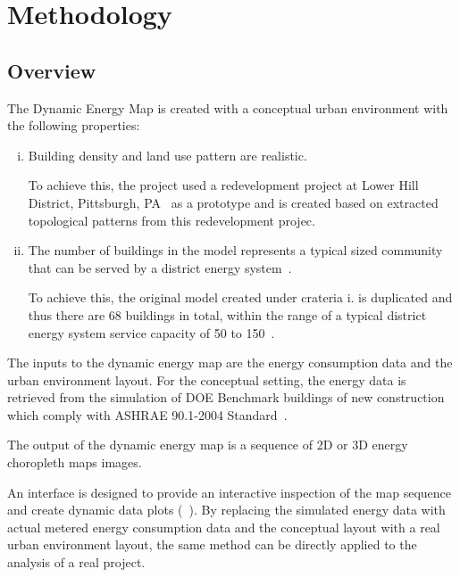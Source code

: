 
\chapter{Methodology} %

\label{Chapter4} %


\section{Overview}
The Dynamic Energy Map is created with a conceptual urban environment
with the following properties:
\begin{enumerate}[i.]
\item Building density and land use pattern are realistic.  
  
  To achieve this, the project used a redevelopment project at Lower
  Hill District, Pittsburgh, PA~\cite{Ramesh2013} as a prototype and
  is created based on extracted topological patterns from this
  redevelopment projec.

\item The number of buildings in the model represents a typical sized
  community that can be served by a district energy
  system~\cite{IDEA2012}.
  
  To achieve this, the original model created under crateria i. is
  duplicated and thus there are 68 buildings in total, within the
  range of a typical district energy system service capacity of 50 to
  150~\cite{IDEA2012}.

\end{enumerate}

The inputs to the dynamic energy map are the energy consumption data
and the urban environment layout. For the conceptual setting, the
energy data is retrieved from the simulation of DOE Benchmark
buildings of new construction which comply with ASHRAE 90.1-2004
Standard~\cite{DOE2015}.

The output of the dynamic energy map is a sequence of 2D or 3D energy
choropleth maps images.

An interface is designed to provide an interactive inspection of the
map sequence and create dynamic data plots (~). By
replacing the simulated energy data with actual metered energy
consumption data and the conceptual layout with a real urban
environment layout, the same method can be directly applied to the
analysis of a real project.

